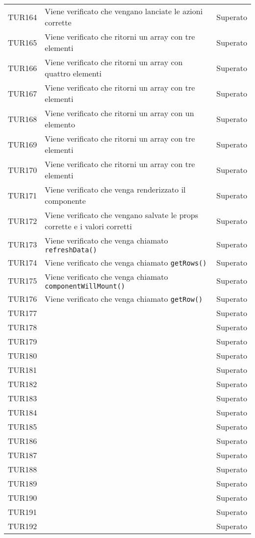 \documentclass[PianoDiQualifica.tex]{subfiles}
\begin{document}
\begin{longtable}[H]{P{2cm}P{8.5cm}P{3cm}}
	TUR164 & Viene verificato che vengano lanciate le azioni corrette & Superato \\ 
	TUR165 & Viene verificato che ritorni un array con tre elementi & Superato \\ 
	TUR166 & Viene verificato che ritorni un array con quattro elementi & Superato \\ 
	TUR167 & Viene verificato che ritorni un array con tre elementi & Superato \\ 
	TUR168 & Viene verificato che ritorni un array con un elemento & Superato \\ 
	TUR169 & Viene verificato che ritorni un array con tre elementi & Superato \\ 
	TUR170 & Viene verificato che ritorni un array con tre elementi & Superato \\ 
	TUR171 & Viene verificato che venga renderizzato il componente & Superato \\ 
	TUR172 & Viene verificato che vengano salvate le props corrette e i valori corretti & Superato \\ 
	TUR173 & Viene verificato che venga chiamato \texttt{refreshData()} & Superato \\ 
	TUR174 & Viene verificato che venga chiamato \texttt{getRows()} & Superato \\ 
	TUR175 & Viene verificato che venga chiamato \texttt{componentWillMount()} & Superato \\ 
	TUR176 & Viene verificato che venga chiamato \texttt{getRow()} & Superato \\
	TUR177 & & Superato \\
	TUR178 & & Superato \\
	TUR179 & & Superato \\
	TUR180 & & Superato \\
	TUR181 & & Superato \\
	TUR182 & & Superato \\
	TUR183 & & Superato \\
	TUR184 & & Superato \\
	TUR185 & & Superato \\
	TUR186 & & Superato \\
	TUR187 & & Superato \\
	TUR188 & & Superato \\
	TUR189 & & Superato \\
	TUR190 & & Superato \\
	TUR191 & & Superato \\
	TUR192 & & Superato \\

\end{longtable}
\end{document}
